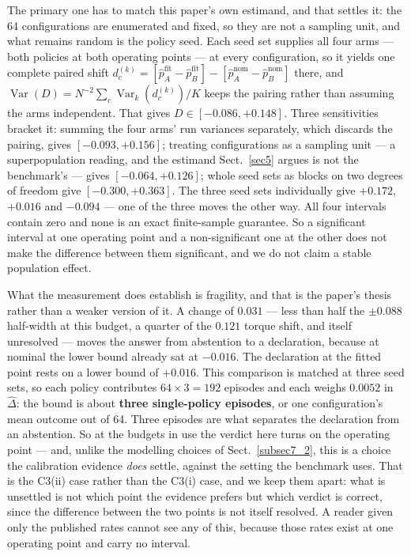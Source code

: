 \documentclass[pdflatex,iicol,sn-apa]{sn-jnl}
\theoremstyle{remark}
\begin{document}
The primary one has to match this paper's own estimand, and that settles it: the 64 configurations
are enumerated and fixed, so they are not a sampling unit, and what remains random is the policy
seed. Each seed set supplies all four arms --- both policies at both operating points --- at every
configuration, so it yields one complete paired shift
$d_c^{(k)} = [\hat p_A^{\mathrm{fit}} - \hat p_B^{\mathrm{fit}}] - [\hat p_A^{\mathrm{nom}} - \hat p_B^{\mathrm{nom}}]$
there, and $\operatorname{Var}(D) = N^{-2}\sum_c \operatorname{Var}_k(d_c^{(k)})/K$ keeps the pairing
rather than assuming the arms independent. That gives
$D \in \mathbf{[-0.086, +0.148]}$. Three sensitivities bracket it: summing the four arms' run
variances separately, which discards the pairing, gives $[-0.093, +0.156]$; treating configurations
as a sampling unit --- a superpopulation reading, and the estimand
Sect.~\ref{sec5} argues is not the benchmark's --- gives $[-0.064, +0.126]$; whole seed sets as
blocks on two degrees of freedom
give $[-0.300, +0.363]$. The three seed sets individually give $+0.172$, $+0.016$ and
$\mathbf{-0.094}$ --- one of the three moves the other way. All four intervals contain zero and none
is an exact finite-sample guarantee. So a significant interval at one operating point and a
non-significant one at the other does not make the difference between them significant, and we do
not claim a stable population effect.

What the measurement does establish is fragility, and that is the paper's thesis rather than a
weaker version of it. A change of $0.031$ --- less than half the $\pm 0.088$ half-width at this
budget, a quarter of the $0.121$ torque shift, and itself unresolved --- moves the answer from
abstention to a declaration, because at nominal the lower bound already sat at $-0.016$. The
declaration at the fitted point rests on a lower bound of $+0.016$. This comparison is matched at
three seed sets, so each policy contributes $64 \times 3 = 192$ episodes and each weighs $0.0052$ in
$\hat\Delta$: the bound is about \textbf{three single-policy episodes}, or one configuration's mean
outcome out of 64. Three episodes are what separates the declaration from an abstention. So at the budgets in use the
verdict here turns on the operating point --- and, unlike the modelling choices of
Sect.~\ref{subsec7_2}, this is a choice the calibration evidence \emph{does} settle, against the
setting the benchmark uses. That is the C3(ii) case rather than the C3(i) case, and we keep them
apart: what is unsettled is not which point the evidence prefers but which verdict is correct, since
the difference between the two points is not itself resolved. A reader given only the published rates
cannot see any of this, because those rates exist at one operating point and carry no interval.
\end{document}
